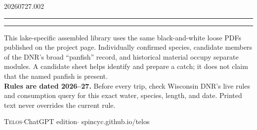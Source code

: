 \usepackage{pdfpages}

\newcommand{\CompendiumBuildRoot}{../../../../build/lake-country-fishing/chatgpt}
\newcommand{\bindpart}[2]{%
  \clearpage\thispagestyle{telosfirst}\null\vspace{0.22\textheight}
  \noindent\rule{\linewidth}{2pt}\par\vspace{0.5em}
  {\fontsize{26}{30}\selectfont\bfseries #1}\par\vspace{0.35em}
  \noindent\rule{\linewidth}{0.4pt}\par\vspace{0.5em}
  \noindent\begin{minipage}{0.84\linewidth}#2\end{minipage}\par\clearpage}
\newcommand{\bindsheet}[1]{%
  }
\newcommand{\bindpages}[2]{%
  }
\newcommand{\bindspecies}[1]{%
  \bindsheet{fish/#1}\bindsheet{cooking/#1}}
\newcommand{\bindspeciesworkbook}[2]{%
  \bindsheet{fish/#1}\bindpages{cooking/#1}{1-#2}}

  {\LakeSubtitle}{20260727.002}


\thispagestyle{empty}
\null\vspace{0.14\textheight}
\noindent\rule{\linewidth}{2.4pt}\par\vspace{0.7em}
{\fontsize{40}{44}\selectfont\bfseries \LakeName}\par\vspace{0.4em}
{\Large \LakeSubtitle}\par\vspace{0.5em}
\noindent\rule{\linewidth}{0.5pt}\par\vspace{1.3em}
\begin{minipage}{0.88\linewidth}
This lake-specific assembled library uses the same black-and-white loose PDFs
published on the project page. Individually confirmed species, candidate
members of the DNR's broad ``panfish'' record, and historical material occupy
separate modules. A candidate sheet helps identify and prepare a catch; it does
not claim that the named panfish is present.\\[0.8em]
\textbf{Rules are dated 2026--27.} Before every trip, check Wisconsin DNR's
live rules and consumption query for this exact water, species, length, and
date. Printed text never overrides the current rule.
\end{minipage}
\vfill
{\small\textsc{Telos}\quad$\cdot$\quad ChatGPT edition\quad$\cdot$\quad
spincyc.github.io/telos}\par
\TelosColophon
\clearpage

